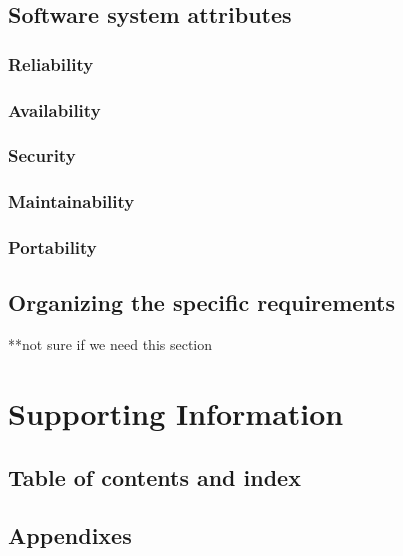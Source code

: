 \documentclass[letterpaper,10pt,draftclsnofoot,onecolumn,titlepage]{IEEEtran}
\begin{document}
	\subsection{Software system attributes}
	\subsubsection{Reliability}
	\subsubsection{Availability}
	\subsubsection{Security}
	\subsubsection{Maintainability}
	\subsubsection{Portability}

	\subsection{Organizing the specific requirements}
	**not sure if we need this section

	\section{Supporting Information}
	\subsection{Table of contents and index}
	\subsection{Appendixes}
\end{document}
